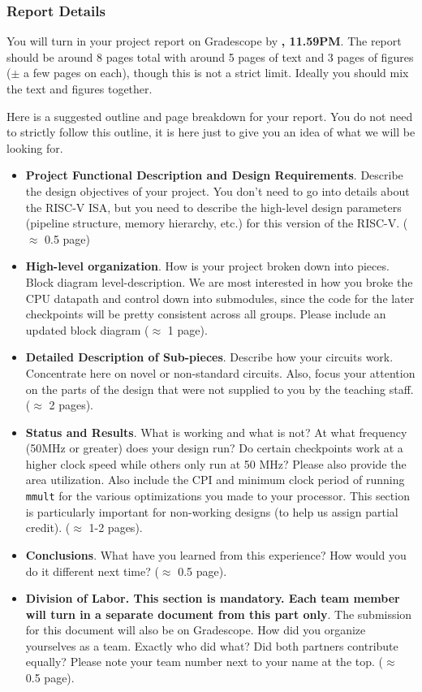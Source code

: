 \documentclass[11pt]{article}
\begin{document}
\subsubsection{Report Details}
You will turn in your project report on Gradescope by \textbf{\finalReportDueDate, 11.59PM}.
The report should be around 8 pages total with around 5 pages of text and 3 pages of figures ($\pm$ a few pages on each), though this is not a strict limit.
Ideally you should mix the text and figures together.

Here is a suggested outline and page breakdown for your report.
You do not need to strictly follow this outline, it is here just to give you an idea of what we will be looking for.

\begin{itemize}
  \item \textbf{Project Functional Description and Design Requirements}. Describe the design objectives of your project.  You don't need to go into details about the RISC-V ISA, but you need to describe the high-level design parameters (pipeline structure, memory hierarchy, etc.) for this version of the RISC-V. ($\approx$ 0.5 page)
  \item \textbf{High-level organization}. How is your project broken down into pieces. Block diagram level-description. We are most interested in how you broke the CPU datapath and control
  down into submodules, since the code for the later checkpoints will be pretty consistent across all groups. Please include an updated block diagram ($\approx$ 1 page).
  \item \textbf{Detailed Description of Sub-pieces}. Describe how your circuits work. Concentrate here on novel or non-standard circuits. Also, focus your attention on the parts of the design that were not supplied to you by the teaching staff. ($\approx$ 2 pages).
  \item \textbf{Status and Results}. What is working and what is not? At what frequency (50MHz or greater) does your design run? Do certain checkpoints work at a higher clock speed while others only run at 50 MHz? Please also provide the area utilization. Also include the CPI and minimum clock period of running \verb|mmult| for the various optimizations you made to your processor. This section is particularly important for non-working designs (to help us assign partial credit). ($\approx$ 1-2 pages).
  \item \textbf{Conclusions}. What have you learned from this experience? How would you do it different next time? ($\approx$ 0.5 page).
  \item \textbf{Division of Labor. This section is mandatory. Each team member will turn in a separate document from this part only}. The submission for this document will also be on Gradescope. How did you organize yourselves as a team. Exactly who did what? Did both partners contribute equally? Please note your team number next to your name at the top. ($\approx$ 0.5 page).
\end{itemize}
\end{document}
